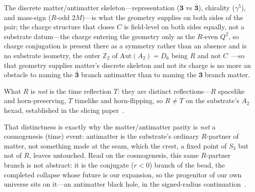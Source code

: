 \documentclass[11pt]{article}
\begin{document}
The discrete matter/antimatter skeleton---representation ($\mathbf 3$ vs $\bar{\mathbf 3}$), chirality ($\gamma^5$), and mass-sign ($R$-odd $2M$)---is what the geometry supplies on both sides of the pair; the charge structure that closes $C$ is field-level on both sides equally, not a substrate datum---the charge entering the geometry only as the $R$-even $Q^2$, so charge conjugation is present there as a symmetry rather than an absence and is no substrate isometry, the outer $\mathbb{Z}_2$ of $\mathrm{Aut}(A_2)=D_6$ being $R$ and not $C$~\cite{JanzenBoundary}---so that geometry supplies matter's discrete skeleton and not its charge is no more an obstacle to naming the $\bar{\mathbf 3}$ branch antimatter than to naming the $\mathbf 3$ branch matter. 

What $R$ is \emph{not} is the time reflection $T$: they are distinct reflections---$R$ spacelike and horn-preserving, $T$ timelike and horn-flipping, so $R\neq T$ on the substrate's $A_2$ hexad, established in the slicing paper~\cite{JanzenSlicing}. 

That distinctness is exactly why the matter/antimatter parity is \emph{not} a cosmogenesis (time) event: antimatter is the substrate's ordinary $R$-partner of matter, not something made at the seam, which the crest, a fixed point of $S_3$ but not of $R$, leaves untouched. Read on the cosmogenesis, this same $R$-partner branch is not abstract: it is the conjugate ($r<0$) branch of the bead, the completed collapse whose future is our expansion, so the progenitor of our own universe sits on it---an antimatter black hole, in the signed-radius continuation~\cite{JanzenCRframework}. 
\end{document}

